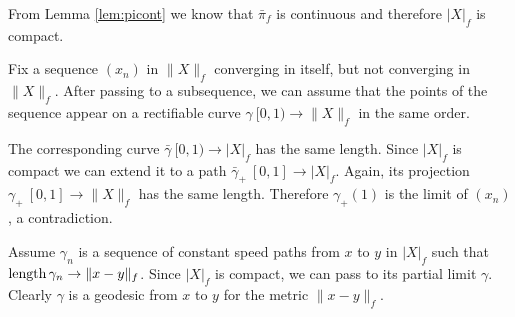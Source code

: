 \documentclass{article}
\begin{document}
From Lemma \ref{lem:picont} we know that $\bar\pi_f$ is continuous and therefore $|X|_f$ is compact.

Fix a sequence $(x_n)$ in $\|X\|_f$ converging in itself, but not converging in $\|X\|_f$.
After passing to a subsequence, we can assume that the points of the sequence appear on a rectifiable curve $\gamma\:[0,1)\to\|X\|_f$ in the same order.

The corresponding curve $\bar\gamma\:[0,1)\to |X|_f$ has the same length.
Since $|X|_f$ is compact we can extend it to a path $\bar\gamma_+\:[0,1]\to |X|_f$.
Again, its projection $\gamma_+\:[0,1]\to\|X\|_f$ has the same length.
Therefore $\gamma_+(1)$ is the limit of $(x_n)$, a contradiction.

Assume $\gamma_n$ is a sequence of constant speed paths from $x$ to $y$ in $|X|_f$
such that $\mathop{\rm length}\nolimits\gamma_n\to \|x-y\|_f$.
Since $|X|_f$ is compact, we can pass to its partial limit $\gamma$.
Clearly $\gamma$ is a geodesic from $x$ to $y$ for the metric $\|x-y\|_f$.
\qeds



\end{document}
